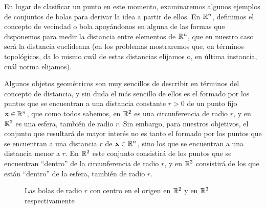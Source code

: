 En lugar de clasificar un punto en este momento, examinaremos algunos ejemplos de conjuntos de bolas para derivar la idea a partir de ellos. En $\RR[n]$, definimos el concepto de vecindad o bola apoyándonos en alguna de las formas que disponemos para medir la distancia entre elementos de $\RR[n]$, que en nuestro caso será la distancia euclideana (en los problemas mostraremos que, en términos topológicos, da lo mismo cuál de estas distancias elijamos o, en última instancia, cuál norma elijamos).

Algunos objetos geométricos son muy sencillos de describir en términos del concepto de distancia, y sin duda el más sencillo de ellos es el formado por los puntos que se encuentran a una distancia constante $r > 0$ de un punto fijo $\mathbf{x} \in \RR[n]$, que como todos sabemos, en $\RR[2]$ es una circunferencia de radio $r$, y en $\RR[3]$ es una esfera, también de radio $r$. Sin embargo, para nuestros objetivos, el conjunto que resultará de mayor interés no es tanto el formado por los puntos que se encuentran a una distancia $r$ de $\mathbf{x} \in \RR[n]$, sino los que se encuentran a una distancia menor a $r$. En $\RR[2]$ este conjunto consistirá de los puntos que se encuentran “dentro” de la circunferencia de radio $r$, y en $\RR[3]$ consistirá de los que están “dentro” de la esfera, también de radio $r$.
\begin{figure}[h!]
    \centering
     \hfill
    \caption{Las bolas de radio $r$ con centro en el origen en $\RR[2]$ y en $\RR[3]$ respectivamente}
\end{figure}


